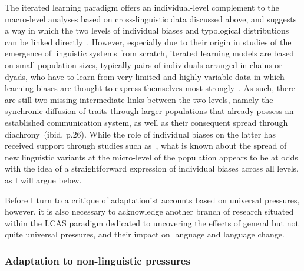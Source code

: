 

The iterated learning paradigm offers an individual-level complement to the macro-level analyses based on cross-linguistic data discussed above, and suggests a way in which the two levels of individual biases and typological distributions can be linked directly~\citep{Kirby1999,Kirby2008}. However, especially due to their origin in studies of the emergence of linguistic systems from scratch, iterated learning models are based on small population sizes, typically pairs of individuals arranged in chains or dyads, who have to learn from very limited and highly variable data in which learning biases are thought to express themselves most strongly~\citep{Fedzechkina2014}. As such, there are still two missing intermediate links between the two levels, namely the synchronic diffusion of traits through larger populations that already possess an established communication system, as well as their consequent spread through diachrony~(ibid, p.26). While the role of individual biases on the latter has received support through studies such as~\citet{Wedel2013short}, what is known about the spread of new linguistic variants at the micro-level of the population appears to be at odds with the idea of a straightforward expression of individual biases across all levels, as I will argue below.

Before I turn to a critique of adaptationist accounts based on universal pressures, however, it is also necessary to acknowledge another branch of research situated within the LCAS paradigm dedicated to uncovering the effects of general but not quite universal pressures, and their impact on language and language change.

\subsubsection{Adaptation to non-linguistic pressures}

